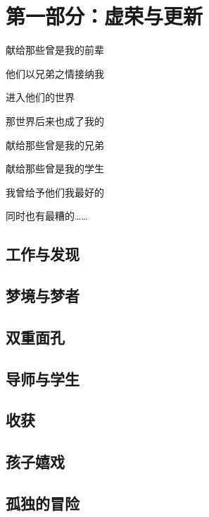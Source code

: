 \part{第一部分：虚荣与更新}

\newpage

\begin{center}
    献给那些曾是我的前辈
    
    他们以兄弟之情接纳我
    
    进入他们的世界
    
    那世界后来也成了我的

    \vspace{1cm}

    献给那些曾是我的兄弟
    
    献给那些曾是我的学生
    
    我曾给予他们我最好的
    
    同时也有最糟的……
\end{center}

\newpage

\chapter{工作与发现}




\chapter{梦境与梦者}











\chapter{双重面孔}









\chapter{导师与学生}








\chapter{收获}









\chapter{孩子嬉戏}




\chapter{孤独的冒险}




